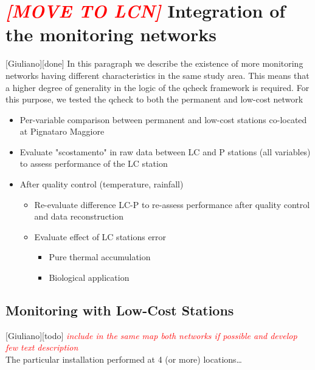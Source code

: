\documentclass[authoryear,preprint,review,12pt]{elsarticle}
\newcommand{\note}[1]{\emph{\textcolor{red}{#1}}}
\begin{document}
\section{\note{[MOVE TO LCN]} Integration of the monitoring networks\label{Integration}}[Giuliano][done]
In this paragraph we describe the existence of more monitoring networks having different characteristics in the same study area.
This means that a higher degree of generality in the logic of the qcheck framework is required.
For this purpose, we tested the qcheck to both the permanent and low-cost network
\begin{itemize}
    \item Per-variable comparison between permanent and low-cost stations co-located at Pignataro Maggiore
    \item Evaluate "scostamento" in raw data between LC and P stations (all variables) to assess performance of the LC station
    \item After quality control (temperature, rainfall)
    \begin{itemize}
        \item Re-evaluate difference LC-P to re-assess performance after quality control and data reconstruction 
        \item Evaluate effect of LC stations error
        \begin{itemize}
            \item Pure thermal accumulation
            \item Biological application
        \end{itemize}
    \end{itemize}
\end{itemize}


   
  





\subsection{Monitoring with Low-Cost Stations}[Giuliano][todo]
\note{include in the same map both networks if possible and develop few text description}\\
The particular installation performed at 4 (or more) locations\ldots
\end{document}
